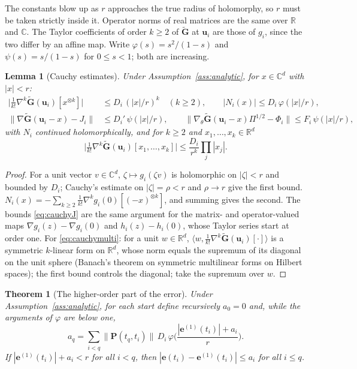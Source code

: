 \documentclass[11pt]{article}
\newtheorem{theorem}{Theorem}
\newtheorem{lemma}{Lemma}
\theoremstyle{definition}
\theoremstyle{remark}
\newcommand{\uu}{\mathbf{u}}
\newcommand{\ee}{\mathbf{e}}
\newcommand{\Gt}{\tilde{\mathbf{G}}}
\newcommand{\Pp}{\mathbf P}
\begin{document}
The constants blow up as $r$ approaches the true radius of holomorphy, so $r$ must be taken strictly inside it.
Operator norms of real matrices are the same over $\mathbb R$ and $\mathbb C$.
The Taylor coefficients of order $k\ge2$ of $\Gt$ at $\uu_i$ are those of $g_i$, since the two differ by an affine map.
Write $\varphi(s)=s^2/(1-s)$ and $\psi(s)=s/(1-s)$ for $0\le s<1$; both are increasing.

\begin{lemma}[Cauchy estimates]\label{lem:cauchy}
Under Assumption~\ref{ass:analytic}, for $x\in\mathbb C^d$ with $|x|<r$:
\begin{align}
\Big|\tfrac1{k!}\nabla^k\Gt(\uu_i)[x^{\otimes k}]\Big|&\le D_i\,(|x|/r)^k\quad(k\ge2),\qquad
|N_i(x)|\le D_i\,\varphi(|x|/r),\label{eq:cauchyN}\\
\big\|\nabla\Gt(\uu_i-x)-J_i\big\|&\le D_i'\,\psi(|x|/r),\qquad
\big\|\nabla_\theta\Gt(\uu_i-x)\Pi^{1/2}-\Phi_i\big\|\le F_i\,\psi(|x|/r),\label{eq:cauchyJ}
\end{align}
with $N_i$ continued holomorphically, and for $k\ge2$ and $x_1,\dots,x_k\in\mathbb R^d$
\begin{equation}\label{eq:cauchymulti}
\Big|\tfrac1{k!}\nabla^k\Gt(\uu_i)[x_1,\dots,x_k]\Big|\le\frac{D_i}{r^k}\prod_j|x_j| .
\end{equation}
\end{lemma}

\begin{proof}
For a unit vector $v\in\mathbb C^d$, $\zeta\mapsto g_i(\zeta v)$ is holomorphic on $|\zeta|<r$ and bounded by $D_i$; Cauchy's estimate on $|\zeta|=\rho<r$ and $\rho\to r$ give the first bound.
$N_i(x)=-\sum_{k\ge2}\tfrac1{k!}\nabla^kg_i(0)[(-x)^{\otimes k}]$, and summing gives the second.
The bounds \eqref{eq:cauchyJ} are the same argument for the matrix- and operator-valued maps $\nabla g_i(z)-\nabla g_i(0)$ and $h_i(z)-h_i(0)$, whose Taylor series start at order one.
For \eqref{eq:cauchymulti}: for a unit $w\in\mathbb R^d$, $\langle w,\tfrac1{k!}\nabla^k\Gt(\uu_i)[\cdot]\rangle$ is a symmetric $k$-linear form on $\mathbb R^d$, whose norm equals the supremum of its diagonal on the unit sphere (Banach's theorem on symmetric multilinear forms on Hilbert spaces); the first bound controls the diagonal; take the supremum over $w$.
\end{proof}

\begin{theorem}[The higher-order part of the error]\label{thm:allorders}
Under Assumption~\ref{ass:analytic}, for each start define recursively $a_0=0$ and, while the arguments of $\varphi$ are below one,
\[
a_q=\sum_{i<q}\|\Pp(t_q,t_i)\|\,D_i\,\varphi\Big(\frac{|\ee^{(1)}(t_i)|+a_i}{r}\Big).
\]
If $|\ee^{(1)}(t_i)|+a_i<r$ for all $i<q$, then $|\ee(t_i)-\ee^{(1)}(t_i)|\le a_i$ for all $i\le q$.
\end{theorem}
\end{document}
